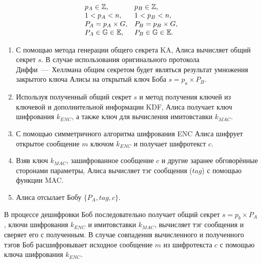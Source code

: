 \[ \begin{array}{ll}
	p_A \in \mathbb{Z}, & p_B \in \mathbb{Z}, \\
	1 < p_A < n, & 1 < p_B < n, \\
	P_A = p_A \times G, & P_B = p_B \times G, \\
	P_A \in \mathbb{G} \in \mathbb{E}, & P_B \in \mathbb{G} \in \mathbb{E}.\\
\end{array} \]

\begin{enumerate}
	\item С помощью метода генерации общего секрета KA, Алиса вычисляет общий секрет $s$. В случае использования оригинального протокола Диффи~---~Хеллмана общим секретом будет являться результат умножения закрытого ключа Алисы на открытый ключ Боба $s = p_a \times P_B$.
	\item Используя полученный общий секрет $s$ и метод получения ключей из ключевой и дополнительной информации KDF, Алиса получает ключ шифрования $k_{ENC}$, а также ключ для вычисления имитовставки $k_{MAC}$.
	\item С помощью симметричного алгоритма шифрования ENC Алиса шифрует открытое сообщение $m$ ключом $k_{ENC}$ и получает шифротекст $c$.
	\item Взяв ключ $k_{MAC}$, зашифрованное сообщение $c$ и другие заранее обговорённые сторонами параметры, Алиса вычисляет тэг сообщения ($tag$) с помощью функции MAC.
	\item Алиса отсылает Бобу $\{P_A, tag, c\}$.
\end{enumerate}

В процессе дешифровки Боб последовательно получает общий секрет $s = p_b \times P_A$, ключи шифрования $k_{ENC}$ и имитовставки $k_{MAC}$, вычисляет тэг сообщения и сверяет его с полученным. В случае совпадения вычисленного и полученного тэгов Боб расшифровывает исходное сообщение $m$ из шифротекста $c$ с помощью ключа шифрования $k_{ENC}$.
